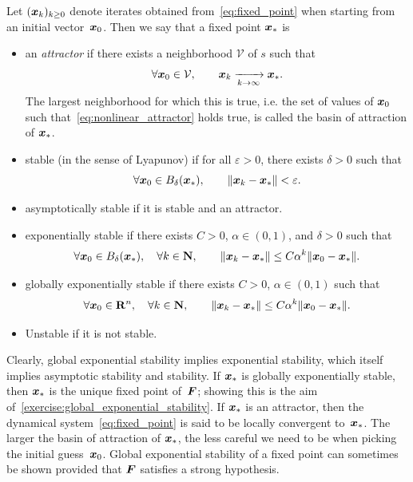 \begin{definition}
    Let $(\mathbf{\boldsymbol{x}}_k)_{k\geq0}$ denote iterates obtained from~\eqref{eq:fixed_point} when starting from an initial vector~$\mathbf{\boldsymbol{x}}_0$.
    Then we say that a fixed point $\mathbf{\boldsymbol{x}}_*$ is
    \begin{itemize}
        \item
            an \emph{attractor} if there exists a neighborhood $\mathcal V$ of $s$ such that
            \begin{equation}
                \label{eq:nonlinear_attractor}
                \forall \mathbf{\boldsymbol{x}}_0 \in \mathcal V, \qquad
                \mathbf{\boldsymbol{x}}_k \xrightarrow[k \to \infty]{} \mathbf{\boldsymbol{x}}_*.
            \end{equation}
            The largest neighborhood for which this is true,
            i.e. the set of values of $\mathbf{\boldsymbol{x}}_0$ such that~\eqref{eq:nonlinear_attractor} holds true,
            is called the basin of attraction of $\mathbf{\boldsymbol{x}}_*$.

        \item
            stable (in the sense of Lyapunov) if for all $\varepsilon > 0$,
            there exists $\delta > 0$ such that
            \[
                \forall \mathbf{\boldsymbol{x}}_0 \in B_{\delta}(\mathbf{\boldsymbol{x}}_*), \qquad
                \lVert\mathbf{\boldsymbol{x}}_k - \mathbf{\boldsymbol{x}}_*\rVert < \varepsilon.
            \]

        \item
            asymptotically stable if it is stable and an attractor.

        \item
            exponentially stable if there exists $C > 0$, $\alpha \in (0, 1)$, and $\delta > 0$ such that
            \[
                \forall \mathbf{\boldsymbol{x}}_0 \in B_{\delta}(\mathbf{\boldsymbol{x}}_*),
                \quad \forall k \in \mathbf N, \qquad
                \lVert\mathbf{\boldsymbol{x}}_k - \mathbf{\boldsymbol{x}}_*\rVert \leq C \alpha^k \lVert\mathbf{\boldsymbol{x}}_0 - \mathbf{\boldsymbol{x}}_*\rVert.
            \]

        \item
            globally exponentially stable if there exists $C > 0$, $\alpha \in (0, 1)$ such that
            \[
                \forall \mathbf{\boldsymbol{x}}_0 \in \mathbf R^n,
                \quad \forall k \in \mathbf N, \qquad
                \lVert\mathbf{\boldsymbol{x}}_k - \mathbf{\boldsymbol{x}}_*\rVert \leq C \alpha^k \lVert\mathbf{\boldsymbol{x}}_0 - \mathbf{\boldsymbol{x}}_*\rVert.
            \]
        \item
            Unstable if it is not stable.
    \end{itemize}
\end{definition}
Clearly, global exponential stability implies exponential stability,
which itself implies asymptotic stability and stability.
If $\mathbf{\boldsymbol{x}}_*$ is globally exponentially stable,
then $\mathbf{\boldsymbol{x}}_*$ is the unique fixed point of~$\mathbf{\boldsymbol{F}}$;
showing this is the aim of~\cref{exercise:global_exponential_stability}.
If $\mathbf{\boldsymbol{x}}_*$ is an attractor,
then the dynamical system~\eqref{eq:fixed_point} is said to be locally convergent to~$\mathbf{\boldsymbol{x}}_*$.
The larger the basin of attraction of $\mathbf{\boldsymbol{x}}_*$,
the less careful we need to be when picking the initial guess~$\mathbf{\boldsymbol{x}}_0$.
Global exponential stability of a fixed point can sometimes be shown
provided that $\mathbf{\boldsymbol{F}}$ satisfies a strong hypothesis.

